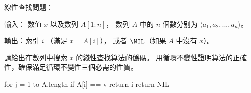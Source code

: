 線性查找問題：

輸入： 数值 $x$ 以及数列 $A[1:n]$，
数列 $A$ 中的 $n$ 個數分别为 $\langle a_1, a_2, ..., a_n \rangle$。

輸出：索引 $i$ （滿足 $x = A[i]$），
或者 $\NIL$（如果 $A$ 中沒有 $x$）。

請給出在數列中搜索 $x$ 的綫性查找算法的僞碼。
用循環不變性證明算法的正確性，確保滿足循環不變性三個必需的性質。
\stopEXERCISE

\startANSWER
\startCLRSCODE
for j = 1 to A.length
	if A[i] == v
		return i
return NIL
\stopCLRSCODE
\stopANSWER
